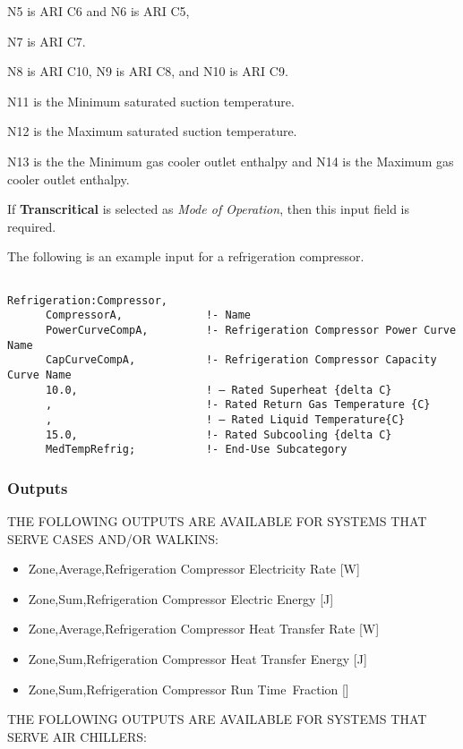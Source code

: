 N5 is ARI C6 and N6 is ARI C5,

N7 is ARI C7.

N8 is ARI C10, N9 is ARI C8, and N10 is ARI C9.

N11 is the Minimum saturated suction temperature.

N12 is the Maximum saturated suction temperature.

N13 is the the Minimum gas cooler outlet enthalpy and N14 is the Maximum gas cooler outlet enthalpy.

If \textbf{Transcritical} is selected as \textit{Mode of Operation}, then this input field is required.

The following is an example input for a refrigeration compressor.

\begin{lstlisting}

Refrigeration:Compressor,
      CompressorA,             !- Name
      PowerCurveCompA,         !- Refrigeration Compressor Power Curve Name
      CapCurveCompA,           !- Refrigeration Compressor Capacity Curve Name
      10.0,                    ! – Rated Superheat {delta C}
      ,                        !- Rated Return Gas Temperature {C}
      ,                        ! – Rated Liquid Temperature{C}
      15.0,                    !- Rated Subcooling {delta C}
      MedTempRefrig;           !- End-Use Subcategory
\end{lstlisting}

\subsubsection{Outputs}\label{outputs-4-013}

THE FOLLOWING OUTPUTS ARE AVAILABLE FOR SYSTEMS THAT SERVE CASES AND/OR WALKINS:

\begin{itemize}
\item
  Zone,Average,Refrigeration Compressor Electricity Rate {[}W{]}
\item
  Zone,Sum,Refrigeration Compressor Electric Energy {[}J{]}
\item
  Zone,Average,Refrigeration Compressor Heat Transfer Rate {[}W{]}
\item
  Zone,Sum,Refrigeration Compressor Heat Transfer Energy {[}J{]}
\item
  Zone,Sum,Refrigeration Compressor Run Time~Fraction {[]}
\end{itemize}

THE FOLLOWING OUTPUTS ARE AVAILABLE FOR SYSTEMS THAT SERVE AIR CHILLERS:

